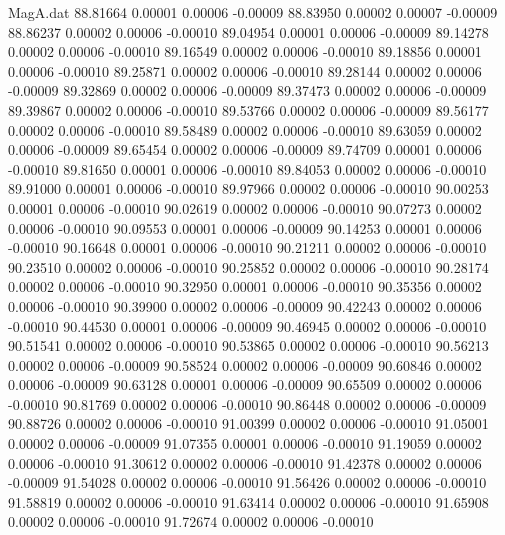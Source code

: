 \begin{filecontents}{MagA.dat}
  88.81664    0.00001    0.00006   -0.00009
  88.83950    0.00002    0.00007   -0.00009
  88.86237    0.00002    0.00006   -0.00010
  89.04954    0.00001    0.00006   -0.00009
  89.14278    0.00002    0.00006   -0.00010
  89.16549    0.00002    0.00006   -0.00010
  89.18856    0.00001    0.00006   -0.00010
  89.25871    0.00002    0.00006   -0.00010
  89.28144    0.00002    0.00006   -0.00009
  89.32869    0.00002    0.00006   -0.00009
  89.37473    0.00002    0.00006   -0.00009
  89.39867    0.00002    0.00006   -0.00010
  89.53766    0.00002    0.00006   -0.00009
  89.56177    0.00002    0.00006   -0.00010
  89.58489    0.00002    0.00006   -0.00010
  89.63059    0.00002    0.00006   -0.00009
  89.65454    0.00002    0.00006   -0.00009
  89.74709    0.00001    0.00006   -0.00010
  89.81650    0.00001    0.00006   -0.00010
  89.84053    0.00002    0.00006   -0.00010
  89.91000    0.00001    0.00006   -0.00010
  89.97966    0.00002    0.00006   -0.00010
  90.00253    0.00001    0.00006   -0.00010
  90.02619    0.00002    0.00006   -0.00010
  90.07273    0.00002    0.00006   -0.00010
  90.09553    0.00001    0.00006   -0.00009
  90.14253    0.00001    0.00006   -0.00010
  90.16648    0.00001    0.00006   -0.00010
  90.21211    0.00002    0.00006   -0.00010
  90.23510    0.00002    0.00006   -0.00010
  90.25852    0.00002    0.00006   -0.00010
  90.28174    0.00002    0.00006   -0.00010
  90.32950    0.00001    0.00006   -0.00010
  90.35356    0.00002    0.00006   -0.00010
  90.39900    0.00002    0.00006   -0.00009
  90.42243    0.00002    0.00006   -0.00010
  90.44530    0.00001    0.00006   -0.00009
  90.46945    0.00002    0.00006   -0.00010
  90.51541    0.00002    0.00006   -0.00010
  90.53865    0.00002    0.00006   -0.00010
  90.56213    0.00002    0.00006   -0.00009
  90.58524    0.00002    0.00006   -0.00009
  90.60846    0.00002    0.00006   -0.00009
  90.63128    0.00001    0.00006   -0.00009
  90.65509    0.00002    0.00006   -0.00010
  90.81769    0.00002    0.00006   -0.00010
  90.86448    0.00002    0.00006   -0.00009
  90.88726    0.00002    0.00006   -0.00010
  91.00399    0.00002    0.00006   -0.00010
  91.05001    0.00002    0.00006   -0.00009
  91.07355    0.00001    0.00006   -0.00010
  91.19059    0.00002    0.00006   -0.00010
  91.30612    0.00002    0.00006   -0.00010
  91.42378    0.00002    0.00006   -0.00009
  91.54028    0.00002    0.00006   -0.00010
  91.56426    0.00002    0.00006   -0.00010
  91.58819    0.00002    0.00006   -0.00010
  91.63414    0.00002    0.00006   -0.00010
  91.65908    0.00002    0.00006   -0.00010
  91.72674    0.00002    0.00006   -0.00010

\end{filecontents}
